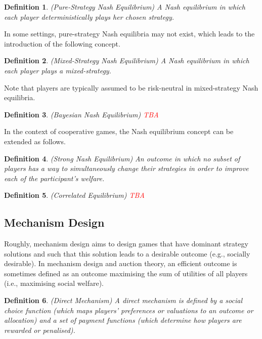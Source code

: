 \documentclass{article}
\newtheorem{definition}{Definition}
\begin{document}
\begin{definition}
(Pure-Strategy Nash Equilibrium) A Nash equilibrium in which each player deterministically plays her chosen strategy.
\end{definition}

In some settings, pure-strategy Nash equilibria may not exist, which leads to the introduction of the following concept.

\begin{definition}
(Mixed-Strategy Nash Equilibrium) A Nash equilibrium in which each player plays a mixed-strategy.
\end{definition}

Note that players are typically assumed to be risk-neutral in mixed-strategy Nash equilibria.

\begin{definition}
(Bayesian Nash Equilibrium) \textcolor{red}{TBA}
\end{definition}

In the context of cooperative games, the Nash equilibrium concept can be extended as follows.

\begin{definition}
(Strong Nash Equilibrium) An outcome in which no subset of players has a way to simultaneously change their strategies in order to improve each of the participant's welfare.
\end{definition}

\begin{definition}
(Correlated Equilibrium) \textcolor{red}{TBA}
\end{definition}

\subsection{Mechanism Design}

Roughly, mechanism design aims to design games that have dominant strategy solutions and such that this solution leads to a desirable outcome (e.g., socially desirable). In mechanism design and auction theory, an efficient outcome is sometimes defined as an outcome maximising the sum of utilities of all players (i.e., maximising social welfare).

\begin{definition}
(Direct Mechanism) A direct mechanism is defined by a social choice function (which maps players' preferences or valuations to an outcome or allocation) and a set of payment functions (which determine how players are rewarded or penalised).
\end{definition}
\end{document}
